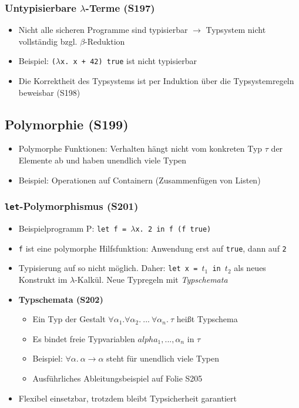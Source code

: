 \subsubsection{Untypisierbare \(\lambda\)-Terme (S197)}
\begin{itemize}
	\item Nicht alle sicheren Programme sind typisierbar \(\rightarrow\) Typsystem nicht vollständig bzgl. \(\beta\)-Reduktion
	\item Beispiel: \texttt{(\(\lambda\)x. x + 42) true} ist nicht typisierbar
	\item Die Korrektheit des Typsystems ist per Induktion über die Typsystemregeln beweisbar (S198)
\end{itemize}


\subsection{Polymorphie (S199)}
\begin{itemize}
	\item Polymorphe Funktionen: Verhalten hängt nicht vom konkreten Typ \(\tau\) der Elemente ab und haben unendlich viele Typen
	\item Beispiel: Operationen auf Containern (Zusammenfügen von Listen)
\end{itemize}

\subsubsection{\texttt{let}-Polymorphismus (S201)}
\begin{itemize}
	\item Beispielprogramm P: \texttt{let f = \(\lambda\)x. 2 in f (f true)}
	\item \texttt{f} ist eine polymorphe Hilfsfunktion: Anwendung erst auf \texttt{true}, dann auf \texttt{2}
	\item Typisierung auf so nicht möglich. Daher: \texttt{let x = \(t_1\) in \(t_2\)} als neues Konstrukt im \(\lambda\)-Kalkül. Neue Typregeln mit \textit{Typschemata}
	\item \textbf{Typschemata (S202)}
	\begin{itemize}
		\item Ein Typ der Gestalt \(\forall\alpha_1.\forall\alpha_2.~...~\forall\alpha_n.~\tau\) heißt Typschema
		\item Es bindet freie Typvariablen \(alpha_1,...,\alpha_n\) in \(\tau\)
		\item Beispiel: \(\forall\alpha.~\alpha\rightarrow\alpha\) steht für unendlich viele Typen
		\item Ausführliches Ableitungsbeispiel auf Folie S205 %
	\end{itemize}
	\item Flexibel einsetzbar, trotzdem bleibt Typsicherheit garantiert
\end{itemize}


